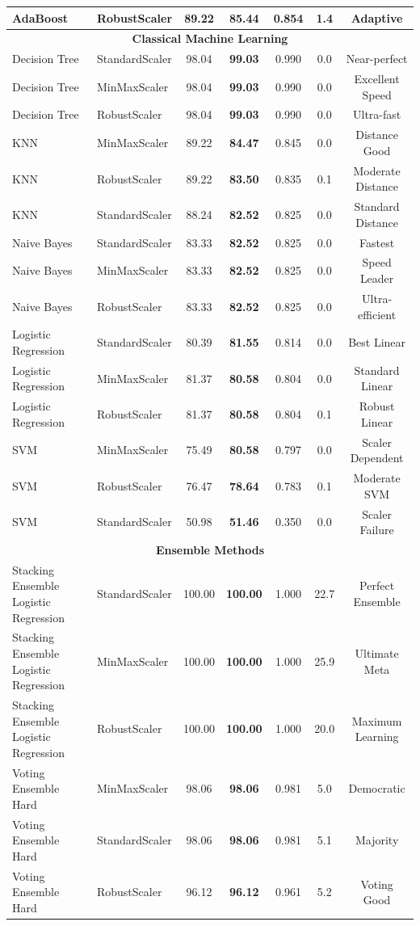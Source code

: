 \begin{table}[H]
{\begin{tabular}{|l|l|c|c|c|c|c|}
AdaBoost & RobustScaler & 89.22 & \textbf{85.44} & 0.854 & 1.4 & Adaptive \\
\hline
\multicolumn{7}{|c|}{\textbf{Classical Machine Learning}} \\
\hline
Decision Tree & StandardScaler & 98.04 & \textbf{99.03} & 0.990 & 0.0 & Near-perfect \\
Decision Tree & MinMaxScaler & 98.04 & \textbf{99.03} & 0.990 & 0.0 & Excellent Speed \\
Decision Tree & RobustScaler & 98.04 & \textbf{99.03} & 0.990 & 0.0 & Ultra-fast \\
KNN & MinMaxScaler & 89.22 & \textbf{84.47} & 0.845 & 0.0 & Distance Good \\
KNN & RobustScaler & 89.22 & \textbf{83.50} & 0.835 & 0.1 & Moderate Distance \\
KNN & StandardScaler & 88.24 & \textbf{82.52} & 0.825 & 0.0 & Standard Distance \\
Naive Bayes & StandardScaler & 83.33 & \textbf{82.52} & 0.825 & 0.0 & Fastest \\
Naive Bayes & MinMaxScaler & 83.33 & \textbf{82.52} & 0.825 & 0.0 & Speed Leader \\
Naive Bayes & RobustScaler & 83.33 & \textbf{82.52} & 0.825 & 0.0 & Ultra-efficient \\
Logistic Regression & StandardScaler & 80.39 & \textbf{81.55} & 0.814 & 0.0 & Best Linear \\
Logistic Regression & MinMaxScaler & 81.37 & \textbf{80.58} & 0.804 & 0.0 & Standard Linear \\
Logistic Regression & RobustScaler & 81.37 & \textbf{80.58} & 0.804 & 0.1 & Robust Linear \\
SVM & MinMaxScaler & 75.49 & \textbf{80.58} & 0.797 & 0.0 & Scaler Dependent \\
SVM & RobustScaler & 76.47 & \textbf{78.64} & 0.783 & 0.1 & Moderate SVM \\
SVM & StandardScaler & 50.98 & \textbf{51.46} & 0.350 & 0.0 & Scaler Failure \\
\hline
\multicolumn{7}{|c|}{\textbf{Ensemble Methods}} \\
\hline
Stacking Ensemble Logistic Regression & StandardScaler & 100.00 & \textbf{100.00} & 1.000 & 22.7 & Perfect Ensemble \\
Stacking Ensemble Logistic Regression & MinMaxScaler & 100.00 & \textbf{100.00} & 1.000 & 25.9 & Ultimate Meta \\
Stacking Ensemble Logistic Regression & RobustScaler & 100.00 & \textbf{100.00} & 1.000 & 20.0 & Maximum Learning \\
Voting Ensemble Hard & MinMaxScaler & 98.06 & \textbf{98.06} & 0.981 & 5.0 & Democratic \\
Voting Ensemble Hard & StandardScaler & 98.06 & \textbf{98.06} & 0.981 & 5.1 & Majority \\
Voting Ensemble Hard & RobustScaler & 96.12 & \textbf{96.12} & 0.961 & 5.2 & Voting Good \\
\hline
\end{tabular}%
}
\end{table}

